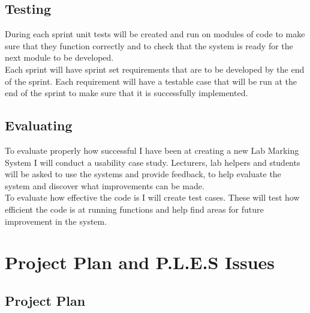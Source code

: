 \documentclass[12pt]{article}  %
\begin{document}
\subsection{Testing}
During each sprint unit tests will be created and run on modules of code to make sure that they function correctly and to check that the system is ready for the next module to be developed.\\
Each sprint will have sprint set requirements that are to be developed by the end of the sprint. Each requirement will have a testable case that will be run at the end of the sprint to make sure that it is successfully implemented.


\subsection{Evaluating}
To evaluate properly how successful I have been at creating a new Lab Marking System I will conduct a usability case study. Lecturers, lab helpers and students will be asked to use the systems and provide feedback, to help evaluate the system and discover what improvements can be made.\\
To evaluate how effective the code is I will create test cases. These will test how efficient the code is at running functions and help find areas for future improvement in the system.







\newpage

\section{Project Plan and P.L.E.S Issues}

\subsection{Project Plan}
\end{document}
